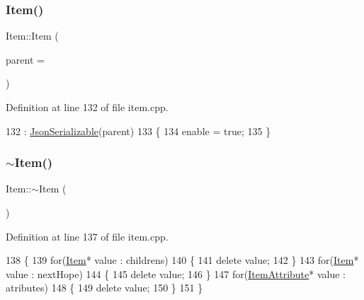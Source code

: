 \subsubsection{\texorpdfstring{Item()}{Item()}\hspace{0.1cm}{\footnotesize\ttfamily [1/2]}}
{\footnotesize\ttfamily Item\+::\+Item (\begin{DoxyParamCaption}\item[{Q\+Object $\ast$}]{parent = {} }\end{DoxyParamCaption})\hspace{0.3cm}{\ttfamily [explicit]}}



Definition at line 132 of file item.\+cpp.


\begin{DoxyCode}
132                           : \hyperlink{class_json_serializable_ab5bc08152c95bca5aad8f1a4e2c09998}{JsonSerializable}(parent)
133 \{
134     enable = \textcolor{keyword}{true};
135 \}
\end{DoxyCode}
\mbox{\label{class_item_a11663c84075b78c3ae5e30fdfcd7c458}} 
\subsubsection{\texorpdfstring{$\sim$\+Item()}{~Item()}}
{\footnotesize\ttfamily Item\+::$\sim$\+Item (\begin{DoxyParamCaption}{ }\end{DoxyParamCaption})}



Definition at line 137 of file item.\+cpp.


\begin{DoxyCode}
138 \{
139     \textcolor{keywordflow}{for}(\hyperlink{class_item}{Item}* value : childrens)
140     \{
141         \textcolor{keyword}{delete} value;
142     \}
143     \textcolor{keywordflow}{for}(\hyperlink{class_item}{Item}* value : nextHope)
144     \{
145         \textcolor{keyword}{delete} value;
146     \}
147     \textcolor{keywordflow}{for}(\hyperlink{class_item_attribute}{ItemAttribute}* value : atributes)
148     \{
149         \textcolor{keyword}{delete} value;
150     \}
151 \}
\end{DoxyCode}
\mbox{\label{class_item_abf5c29843b8d9106348c9fed7904a6cd}} 
